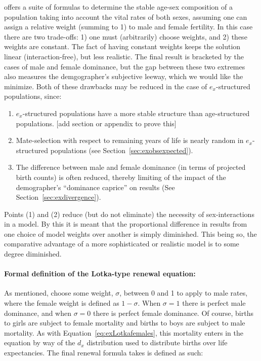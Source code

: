 \citet{goodman1967age} offers a suite of
formulas to determine the stable age-sex composition of a population taking into
account the vital rates of both sexes, assuming one can assign a relative weight
(summing to 1) to male and female fertility. In this case there are two
trade-offs: 1) one must (arbitrarily) choose weights, and 2) these weights are
constant. The fact of having constant weights keeps the solution linear
(interaction-free), but less realistic. The final result is bracketed by the
cases of male and female dominance, but the gap between these two extremes 
also measures the demgographer's subjective leeway, which we would like the
minimize. Both of these drawbacks may be reduced in the case of $e_x$-structured
populations, since: 
\begin{enumerate}
  \item $e_x$-structured populations have a more stable structure
than age-structured populations. [add section or appendix to prove this]
\item Mate-selection with respect to remaining years of
life is nearly random in $e_x$-structured populations (see
Section~\ref{sec:exobsexpected}).
\item The difference between male and female dominance (in terms of projected
birth counts) is often reduced, thereby limiting of the impact of the
demographer's ``dominance caprice'' on results (See
Section~\ref{sec:exdivergence}).
\end{enumerate}
Points (1) and (2) reduce (but do
not eliminate) the necessity of sex-interactions in a model. By this it is meant
that the proportional difference in results from one choice of model weights
over another is simply diminished. This being so, the comparative advantage of a
more sophisticated or realistic model is to some degree diminished. 

\paragraph{Formal definition of the Lotka-type renewal equation:}

As mentioned, choose some weight, $\sigma$, between 0 and 1 to apply to male
rates, where the female weight is defined as $1 - \sigma$. When $\sigma = 1$
there is perfect male dominance, and when $\sigma = 0$ there is perfect female
dominance. Of course, births to girls are subject to female mortality and births
to boys are subject to male mortality. As with
Equation~\eqref{eq:exLotkafemales}, this mortality enters in the equation by way
of the $d_x$ distribution used to distribute births over life expectancies. The
final renewal formula takes is defined as such:

